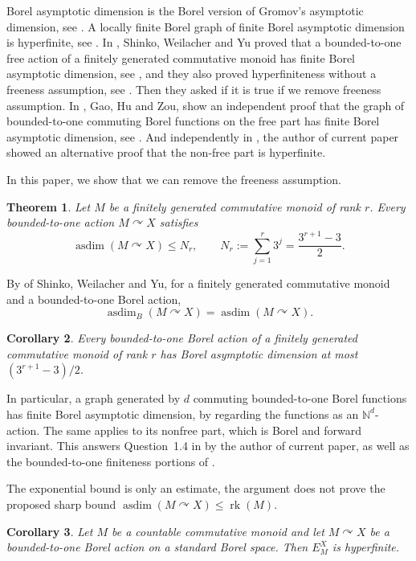 \documentclass[11pt,letterpaper]{article}
\newtheorem{theorem}{Theorem}[section]
\newtheorem{corollary}[theorem]{Corollary}
\theoremstyle{definition}
\DeclareMathOperator{\asdim}{asdim}
\DeclareMathOperator{\rk}{rk}
\newcommand{\NN}{\mathbb N}
\newcommand{\act}{\curvearrowright}
\begin{document}
Borel asymptotic dimension is the Borel version of Gromov's asymptotic dimension, see \cite{Gro93}. A locally finite Borel graph of finite Borel asymptotic dimension is hyperfinite, see \cite{CJMST}. In \cite{SWY}, Shinko, Weilacher and Yu proved that a bounded-to-one free action of a finitely generated commutative monoid has finite Borel asymptotic dimension, see \cite[Theorem 1.6]{SWY}, and they also proved hyperfiniteness without a freeness assumption, see \cite[Theorem 1.5]{SWY}. Then they asked if it is true if we remove freeness assumption. In \cite{GHZ}, Gao, Hu and Zou, show an independent proof that the graph of bounded-to-one commuting Borel functions on the free part has finite Borel asymptotic dimension, see \cite[Theorem 1.2]{GHZ}. And independently in \cite{Wang}, the author of current paper showed an alternative proof that the non-free part is hyperfinite.

In this paper, we show that we can remove the freeness assumption.

\begin{theorem}\label{thm:main}
Let $M$ be a finitely generated commutative monoid of rank $r$. Every
bounded-to-one action $M\act X$ satisfies
\begin{equation}\label{eq:main-bound}
  \asdim(M\act X)\le N_r,
  \qquad
  N_r:=\sum_{j=1}^{r}3^j=\frac{3^{r+1}-3}{2}.
\end{equation}
\end{theorem}

By \cite[Corollary~5.16]{SWY} of Shinko, Weilacher and Yu, for a finitely generated commutative monoid and a bounded-to-one Borel
action,
\[
 \asdim_B(M\act X)=\asdim(M\act X).
\]

\begin{corollary}\label{cor:borel}
Every bounded-to-one Borel action of a finitely generated commutative
monoid of rank $r$ has Borel asymptotic dimension at most
$(3^{r+1}-3)/2$.
\end{corollary}

In particular, a graph generated by $d$ commuting bounded-to-one Borel
functions has finite Borel asymptotic dimension, by regarding the functions
as an $\NN^d$-action. The same applies to its nonfree part, which is Borel
and forward invariant. This answers Question~1.4 in \cite{Wang} by the author of current paper, as
well as the bounded-to-one finiteness portions of
\cite[Questions~1.8 and~5.17]{SWY}.

The exponential bound is only an estimate, the argument does not prove the proposed
sharp bound $\asdim(M\act X)\le\rk(M)$.
\begin{corollary}\label{cor:countable-hyperfinite}
Let $M$ be a countable commutative monoid and let $M\act X$ be a
bounded-to-one Borel action on a standard Borel space. Then
$E_M^X$ is hyperfinite.
\end{corollary}
\end{document}
